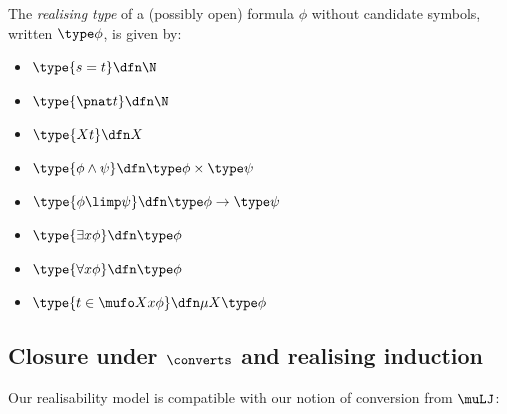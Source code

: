 \begin{definition}
    The \emph{realising type} of a (possibly open) formula $\phi$ without candidate symbols, written $\type \phi$, is given by:
\begin{itemize}
    \item $\type{s=t} \dfn \N$
    \item $\type{\pnat t} \dfn \N$
    \item $\type {Xt} \dfn X$
    \item $\type{\phi\land \psi} \dfn \type \phi \times \type \psi$
    \item $\type{\phi \limp \psi} \dfn \type \phi \to \type \psi$
    \item $\type{\exists x \phi}\dfn  \type \phi$
     \item $\type{\forall x \phi} \dfn \type\phi$
    \item $\type {t \in \mufo X x \phi} \dfn \mu X  \type \phi$
\end{itemize}
\end{definition}




\subsection{Closure under $\converts$ and realising induction}
Our realisability model is compatible with our notion of conversion from $\muLJ$:

